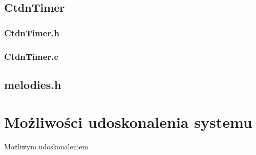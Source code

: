 \documentclass[fleqn]{article}
\begin{document}
\noindent\begin{minipage}[t]{.45\textwidth}
\subsection{CtdnTimer}
\subsubsection{CtdnTimer.h}

\subsubsection{CtdnTimer.c}

\end{minipage}\hfill
\noindent\begin{minipage}[t]{.45\textwidth}
\subsection{melodies.h}

\end{minipage}\hfill

\pagebreak

\section{Możliwości udoskonalenia systemu}
Możliwym udoskonaleniem
\end{document}

